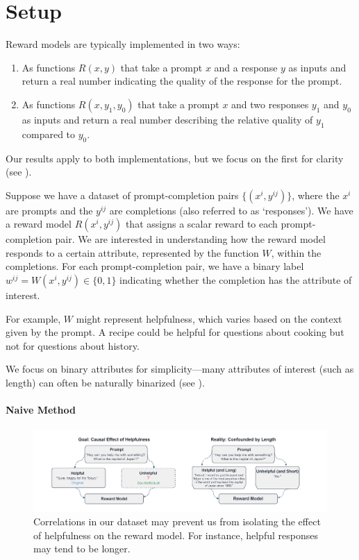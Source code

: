 \documentclass{article}
\begin{document}
\section{Setup}
\label{sec:setup}
Reward models are typically implemented in two ways:
\begin{enumerate}
  \item As functions $R(x, y)$ that take a prompt $x$ and a response $y$ as inputs and return a real number indicating the quality of the response for the prompt.
  \item As functions $R(x, y_1, y_0)$ that take a prompt $x$ and two responses $y_1$ and $y_0$ as inputs and return a real number describing the relative quality of $y_1$ compared to $y_0$.
\end{enumerate}

Our results apply to both implementations, but we focus on the first for clarity (see ).

Suppose we have a dataset of prompt-completion pairs $\{(x^i, y^{ij})\}$, where the $x^i$ are prompts and the $y^{ij}$ are completions (also referred to as `responses'). We have a reward model $R(x^i, y^{ij})$ that assigns a scalar reward to each prompt-completion pair. We are interested in understanding how the reward model responds to a certain attribute, represented by the function $W$, within the completions. For each prompt-completion pair, we have a binary label $w^{ij} = W(x^i, y^{ij}) \in \{0, 1\}$ indicating whether the completion has the attribute of interest.

For example, $W$ might represent helpfulness, which varies based on the context given by the prompt. A recipe could be helpful for questions about cooking but not for questions about history.

We focus on binary attributes for simplicity---many attributes of interest (such as length) can often be naturally binarized (see ).

\paragraph{Naive Method}
\begin{figure}[t]
  \centering
  \includegraphics[width=\linewidth]{figures/compare.png}
  \caption{Correlations in our dataset may prevent us from isolating the effect of helpfulness on the reward model. For instance, helpful responses may tend to be longer.}
  \label{fig:compare}
\end{figure}
\end{document}
